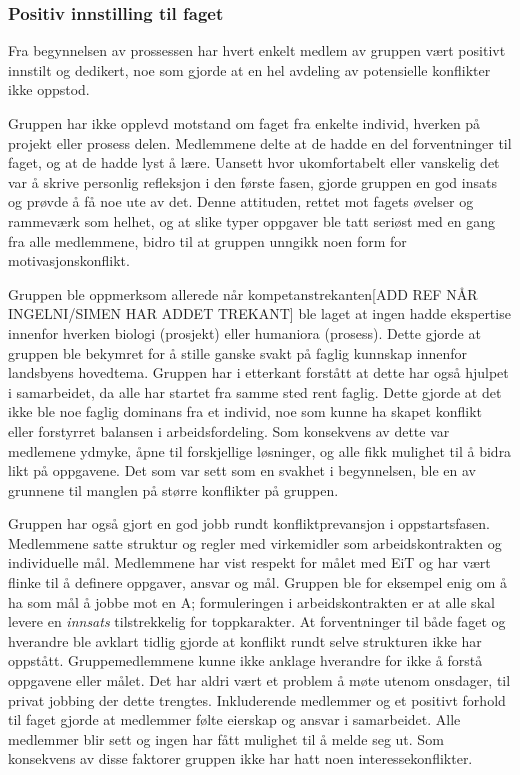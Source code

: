 \subsubsection{Positiv innstilling til faget}
 
Fra begynnelsen av prossessen har hvert enkelt medlem av gruppen vært positivt innstilt og dedikert, noe som gjorde at en hel avdeling av potensielle konflikter ikke oppstod.

Gruppen har ikke opplevd motstand om faget fra enkelte individ, hverken på projekt eller prosess delen. Medlemmene delte at de hadde en del forventninger til faget, og at de hadde lyst å lære. Uansett hvor ukomfortabelt eller vanskelig det var å skrive personlig refleksjon i den første fasen, gjorde gruppen en god insats og prøvde å få noe ute av det. Denne attituden, rettet mot fagets øvelser og rammeværk som helhet, og at slike typer oppgaver ble tatt seriøst med en gang fra alle medlemmene, bidro til at gruppen unngikk noen form for motivasjonskonflikt.

Gruppen ble oppmerksom allerede når kompetanstrekanten[ADD REF NÅR INGELNI/SIMEN HAR ADDET TREKANT] ble laget at ingen hadde ekspertise innenfor hverken biologi (prosjekt) eller humaniora (prosess). Dette gjorde at gruppen ble bekymret for å stille ganske svakt på faglig kunnskap innenfor landsbyens hovedtema. Gruppen har i etterkant forstått at dette har også hjulpet i samarbeidet, da alle har startet fra samme sted rent faglig. Dette gjorde at det ikke ble noe faglig dominans fra et individ, noe som kunne ha skapet konflikt eller forstyrret balansen i arbeidsfordeling. Som konsekvens av dette var medlemene ydmyke, åpne til forskjellige løsninger, og alle fikk mulighet til å bidra likt på oppgavene. Det som var sett som en svakhet i begynnelsen, ble en av grunnene til manglen på større konflikter på gruppen.

Gruppen har også gjort en god jobb rundt konfliktprevansjon i oppstartsfasen. Medlemmene satte struktur og regler med virkemidler som arbeidskontrakten og individuelle mål.  Medlemmene har vist respekt for målet med EiT og har vært flinke til å definere oppgaver, ansvar og mål. Gruppen ble for eksempel enig om å ha som mål å jobbe mot en A; formuleringen i arbeidskontrakten er at alle skal levere en \emph{innsats} tilstrekkelig for toppkarakter. At forventninger til både faget og hverandre ble avklart tidlig gjorde at konflikt rundt selve strukturen ikke har oppstått. Gruppemedlemmene kunne ikke anklage hverandre for ikke å forstå oppgavene eller målet. Det har aldri vært et problem å møte utenom onsdager, til privat jobbing der dette trengtes. Inkluderende medlemmer og et positivt forhold til faget gjorde at medlemmer følte eierskap og ansvar i samarbeidet. Alle medlemmer blir sett og ingen har fått mulighet til å melde seg ut. Som konsekvens av disse faktorer gruppen ikke har hatt noen interessekonflikter.
